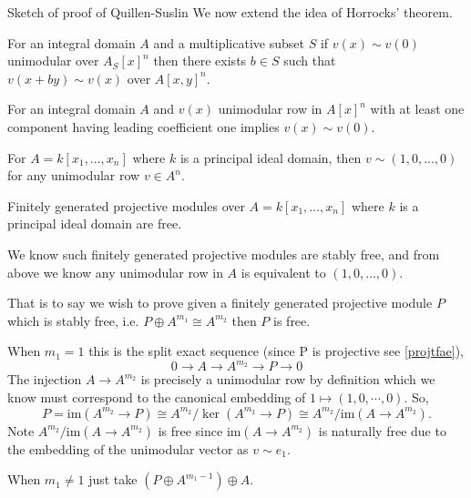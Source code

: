 \documentclass{beamer}
\begin{document}
\begin{frame}[allowframebreaks]{Sketch of proof of Quillen-Suslin}
	We now extend the idea of Horrocks' theorem.
	\begin{lemma}\label{horrocksbutforlocal}
		For an integral domain $A$ and a multiplicative subset $S$ if $v(x) \sim v(0)$ unimodular over $A_S[x]^n $ then there exists $b \in S$ such that \\$v(x+by) \sim v(x) $ over $A[x,y]^n.$
	\end{lemma}
		\begin{lemma}\label{horrocksbuteverything}
		For an integral domain $A$ and $v(x)$ unimodular row in $A[x]^n$ with at least one component having leading coefficient one implies $v(x) \sim v(0)$.
	\end{lemma}
	\begin{theorem}
		For $A=k[x_1, \dots, x_n]$ where $k $ is a principal ideal domain, then $v \sim (1,0,\dots, 0)$ for any unimodular row $v \in A^n$.
	\end{theorem}
	
		\begin{theorem}
		Finitely generated projective modules over $A=k[x_1,\dots,x_n]$ where $k$ is a principal ideal domain are free.
	\end{theorem}
	We know such finitely generated projective modules are stably free, and from above we know any unimodular row in $A$ is equivalent to $(1,0,\dots,0)$.
		
		That is to say we wish to prove given a finitely generated projective module $P$ which is stably free, i.e. $P \oplus A^{m_1} \cong A^{m_2}$ then $P$ is free.
		
		When $m_1=1$ this is the split exact sequence (since P is projective see \ref{projtfae}),
		\[ 0 \to A \to A^{m_2}  \to P \to 0 \]
		The injection $A \to A^{m_2}$ is precisely a unimodular row by definition which we know must correspond to the canonical embedding of $1 \mapsto (1,0,\cdots, 0)$.
		So,$$P = \mathrm{im}(A^{m_2} \to P) \cong A^{m_2}/\ker (A^{m_2} \to P) \cong A^{m_2}/\mathrm{im}(A \to A^{m_2}).$$
		Note $A^{m_2}/\mathrm{im}(A \to A^{m_2})$ is free since $\mathrm{im}(A \to A^{m_2})$ is naturally free due to the embedding of the unimodular vector as $v \sim e_1$.
		
		When $m_1 \neq 1$ just take $(P \oplus A^{m_1-1}) \oplus A$.

	
\end{frame}
\end{document}
